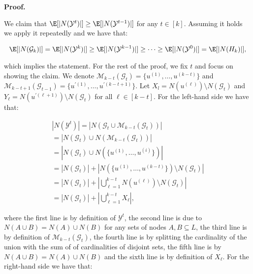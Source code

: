 \documentclass[10pt,a4paper]{article}
\begin{document}



\par\medskip\noindent\textbf{Proof.}\par



We claim that $\E[|N(\mathcal{Y}^{t})|]\geq\E[|N(\mathcal{Y}^{t-1})|]$ for any $t\in[k]$.
Assuming it holds we apply it repeatedly and we have that:\par


\[\begin{gathered}
\displaystyle\E[|N(\mathcal{G}_{k})|]=\E[|N(\mathcal{Y}^{k})|]\geq\E[|N(\mathcal{Y}^{k-1})|]\geq\dots\geq\E[|N(\mathcal{Y}^{0})|]=\E[|N(H_{k})|],
\end{gathered}\]


which implies the statement.
For the rest of the proof, we fix $t$ and focus on showing the claim.
We denote $\mathcal{M}_{k-t}(\mathcal{G}_{t})=\{u^{(1)},\dots,u^{(k-t)}\}$ and $\mathcal{M}_{k-t+1}(\mathcal{G}_{t-1})=\{u^{\prime(1)},\dots,u^{\prime(k-t+1)}\}$.
Let $X_{l}=N(u^{(\ell)})\setminus N(\mathcal{G}_{t})$ and $Y_{\ell}=N(u^{\prime(\ell+1)})\setminus N(\mathcal{G}_{t})$ for all $\ell\in[k-t]$.
For the left-hand side we have that:\par


\[\begin{gathered}
\displaystyle|N(\mathcal{Y}^{t})| \displaystyle=|N(\mathcal{G}_{t}\cup\mathcal{M}_{k-t}(\mathcal{G}_{t}))| \\
\displaystyle=|N(\mathcal{G}_{t})\cup N(\mathcal{M}_{k-t}(\mathcal{G}_{t}))| \\
\displaystyle=|N(\mathcal{G}_{t})\cup N(\{u^{(1)},\dots,u^{(i)}\})| \\
\displaystyle=|N(\mathcal{G}_{t})|+|N(\{u^{(1)},\dots,u^{(k-t)}\})\setminus N(\mathcal{G}_{t})| \\
\displaystyle=|N(\mathcal{G}_{t})|+|\bigcup_{\ell=1}^{k-t}{N(u^{(\ell)})\setminus N(\mathcal{G}_{t})}| \\
\displaystyle=|N(\mathcal{G}_{t})|+|\bigcup_{\ell=1}^{k-t}{X_{\ell}}|,
\end{gathered}\]


where the first line is by definition of $\mathcal{Y}^{t}$, the second line is due to $N(A\cup B)=N(A)\cup N(B)$ for any sets of nodes $A,B\subseteq L$, the third line is by definition of $\mathcal{M}_{k-t}(\mathcal{G}_{t})$, the fourth line is by splitting the cardinality of the union with the sum of of cardinalities of disjoint sets, the fifth line is by $N(A\cup B)=N(A)\cup N(B)$ and the sixth line is by definition of $X_{\ell}$.
For the right-hand side we have that:\par
\end{document}
